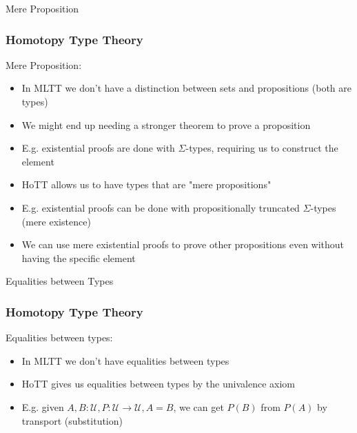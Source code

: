 \documentclass[9pt]{beamer}
\begin{document}
\begin{frame}{Mere Proposition}
\frametitle{Homotopy Type Theory}

Mere Proposition:

\begin{itemize}

  \item In MLTT we don't have a distinction between sets and propositions (both are types)
  \item We might end up needing a \alert{stronger theorem} to prove a proposition
  \item E.g. existential proofs are done with $\Sigma$-types, requiring us to \alert{construct} the element
  \item<2-> HoTT allows us to have types that are "\alert{mere propositions}"
  \item<2-> E.g. existential proofs can be done with propositionally truncated $\Sigma$-types (mere existence)
  \item<2-> We can use mere existential proofs to prove other propositions even \alert{without} having the specific element

\end{itemize}

\end{frame}

\begin{frame}{Equalities between Types}
\frametitle{Homotopy Type Theory}
Equalities between types:

\begin{itemize}

  \item In MLTT we don't have equalities between types
  \item HoTT gives us equalities between types by the \alert{univalence axiom}
  \item E.g. given $A, B : \mathcal{U}, P : \mathcal{U} \rightarrow \mathcal{U}, A = B$,
        we can get $P(B)$ from $P(A)$ by transport (substitution)

\end{itemize}


\end{frame}
\end{document}
